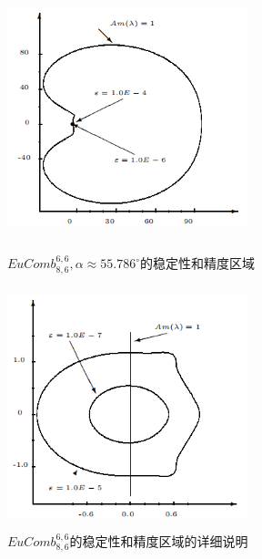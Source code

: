 \documentclass[12pt,a4paper]{article}
\begin{document}
\begin{figure}[H]
	{
		\begin{minipage}{6cm}
			\centering
			\includegraphics[width=7cm,height=7cm]{./figures/21.png}
			\caption{$EuComb_{8,6}^{6,6}, \alpha \approx 55.786^{\circ}$的稳定性和精度区域}
			\label{5.21}
		\end{minipage}
	}
	{
		\begin{minipage}{6cm}
			\centering
			\includegraphics[width=7cm,height=7cm]{./figures/22.png}
			\caption{$EuComb_{8,6}^{6,6}$的稳定性和精度区域的详细说明}
			\label{5.22}
		\end{minipage}
	}
\end{figure}
\end{document}
